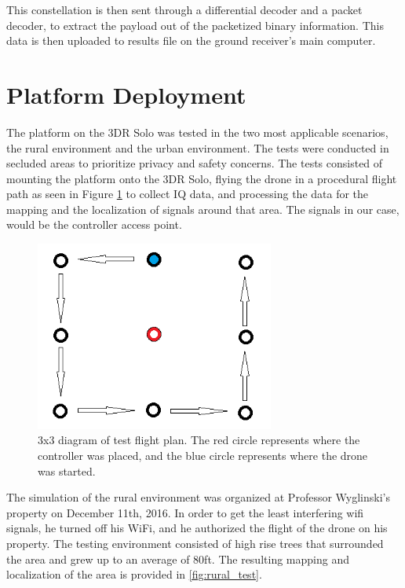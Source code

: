 This constellation is then sent through a differential decoder and a packet decoder, to extract the payload out of the packetized binary information. This data is then uploaded to results file on the ground receiver’s main computer.

\section{Platform Deployment}
The platform on the 3DR Solo was tested in the two most applicable scenarios, the rural environment and the urban environment. The tests were conducted in secluded areas to prioritize privacy and safety concerns. The tests consisted of mounting the platform onto the 3DR Solo, flying the drone in a procedural flight path as seen in Figure \ref{fig:test_setup} to collect IQ data, and processing the data for the mapping and the localization of signals around that area. The signals in our case, would be the controller access point. 

\begin{figure}[ht!]
	\centering
	\includegraphics[width=0.70\textwidth]{img/Test_Plan.png}
	\caption{3x3 diagram of test flight plan. The red circle represents where the controller was placed, and the blue circle represents where the drone was started.}
	\label{fig:test_setup}
\end{figure} \par

The simulation of the rural environment was organized at Professor Wyglinski's property on December 11th, 2016. In order to get the least interfering wifi signals, he turned off his WiFi, and he authorized the flight of the drone on his property. The testing environment consisted of high rise trees that surrounded the area and grew up to an average of 80ft. The resulting mapping and localization of the area is provided in \ref{fig:rural_test}.

